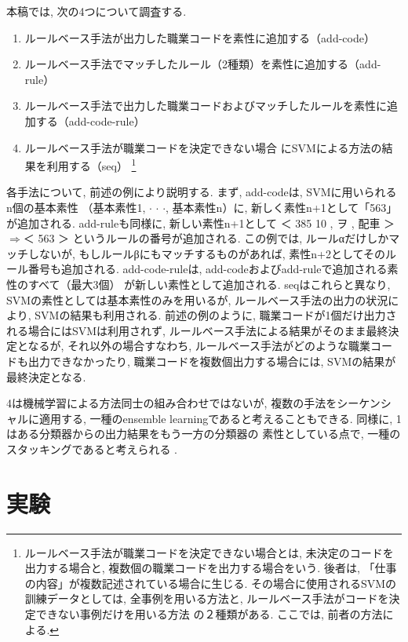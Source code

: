 \documentclass{nlp}
\begin{document}
本稿では, 次の4つについて調査する. 

\begin{enumerate}
\item ルールベース手法が出力した職業コードを素性に追加する（add-code）
\item ルールベース手法でマッチしたルール（2種類）を素性に追加する（add-rule）
\item ルールベース手法で出力した職業コードおよびマッチしたルールを素性に追加する（add-code-rule）
\item ルールベース手法が職業コードを決定できない場合
にSVMによる方法の結果を利用する（seq）
\footnote{ルールベース手法が職業コードを決定できない場合とは, 
未決定のコードを出力する場合と, 
複数個の職業コードを出力する場合をいう. 
後者は, 「仕事の内容」が複数記述されている場合に生じる. 
その場合に使用されるSVMの訓練データとしては,
全事例を用いる方法と,  
ルールベース手法がコードを決定できない事例だけを用いる方法 
の２種類がある. 
ここでは, 前者の方法による. }
\end{enumerate}

各手法について, 前述の例により説明する. 
まず, add-codeは, 
SVMに用いられるn個の基本素性
（基本素性1, $\cdot$  $\cdot$  $\cdot$, 基本素性n）に, 
新しく素性n+1として「563」が追加される. 
add-ruleも同様に, 新しい素性n+1として
＜ 385 10 , ヲ , 配車 ＞$\Rightarrow$＜ 563 ＞
というルールの番号が追加される. 
この例では, 
ルールαだけしかマッチしないが, 
もしルールβにもマッチするものがあれば, 
素性n+2としてそのルール番号も追加される. 
add-code-ruleは, 
add-codeおよびadd-ruleで追加される素性のすべて（最大3個）
が新しい素性として追加される. 
seqはこれらと異なり, SVMの素性としては基本素性のみを用いるが, 
ルールベース手法の出力の状況により, 
SVMの結果も利用される. 
前述の例のように, 
職業コードが1個だけ出力される場合にはSVMは利用されず, 
ルールベース手法による結果がそのまま最終決定となるが, 
それ以外の場合すなわち, 
ルールベース手法がどのような職業コードも出力できなかったり, 
職業コードを複数個出力する場合には, 
SVMの結果が最終決定となる. 
 
4は機械学習による方法同士の組み合わせではないが, 
複数の手法をシーケンシャルに適用する, 
一種のensemble learningであると考えることもできる\cite{Sebastiani02}. 
同様に, 1はある分類器からの出力結果をもう一方の分類器の
素性としている点で, 一種のスタッキングであると考えられる
\cite{Wolpert92}. 

\section{実験}
\end{document}
